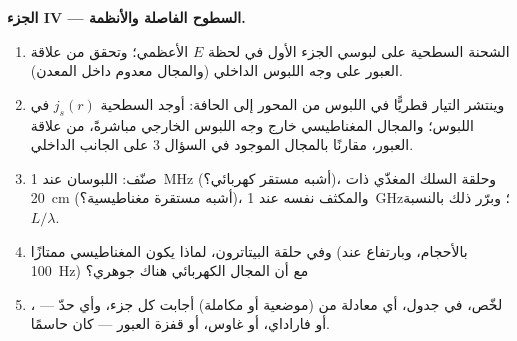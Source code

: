 \begin{problem}
\medskip
\noindent\textbf{الجزء IV --- السطوح الفاصلة والأنظمة.}
\begin{enumerate}[resume]
  \item الشحنة السطحية على لبوسي الجزء الأول في لحظة
        $E$ الأعظمي؛ وتحقق من علاقة العبور على وجه اللبوس
        الداخلي (والمجال معدوم داخل المعدن).
  \item وينتشر التيار قطريًّا في اللبوس من المحور إلى
        الحافة: أوجد  السطحية $j_s(r)$ في اللبوس؛ والمجال
        المغناطيسي خارج وجه اللبوس الخارجي مباشرةً، من
        علاقة العبور، مقارنًا بالمجال الموجود في السؤال 3
        على الجانب الداخلي.
  \item صنّف: اللبوسان عند \qty{1}{MHz} (أشبه مستقر كهربائي؟)، وحلقة
        السلك المغذّي ذات \qty{20}{cm} (أشبه مستقرة مغناطيسية؟)، والمكثف نفسه عند
        \qty{1}{GHz}؛ وبرّر ذلك بالنسبة $L/\lambda$.
  \item وفي حلقة البيتاترون، لماذا يكون 
        المغناطيسي ممتازًا (بالأحجام، وبارتفاع عند \qty{100}{Hz}) مع أن
        المجال الكهربائي هناك جوهري؟
  \item لخّص، في جدول، أي معادلة من  (موضعية أو
        مكاملة) أجابت كل جزء، وأي حدّ --- ، أو فاراداي، أو غاوس، أو قفزة العبور --- كان حاسمًا.
\end{enumerate}
\end{problem}
